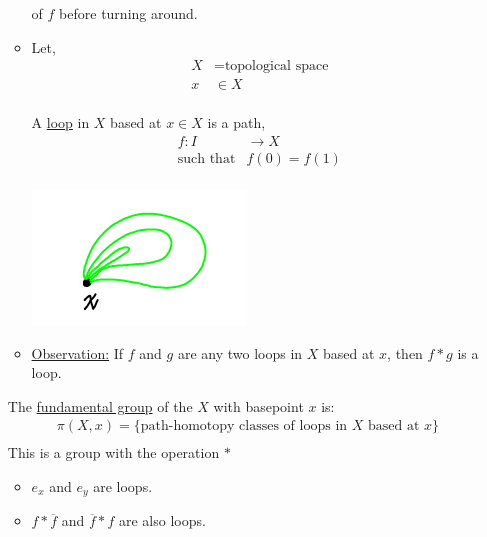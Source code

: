 \begin{itemize}
\begin{itemize}
            of $f$ before turning around.
        \item Let,
            \begin{align*}
                X&=\text{topological space}\\
                x&\in X\\
            \end{align*}
            \begin{definition} A \underline{loop} in $X$ based at $x\in X$ is a path,
            \begin{align*}
                f:I&\rightarrow X\\
                \text{such that}
                &f(0)=f(1)\\
            \end{align*}
            \end{definition}
            \begin{minipage}[c]{\linewidth}
                \begin{center}
                \includegraphics[]{images/loops.png}
                \end{center}
            \end{minipage}
        \item \underline{Observation:} If $f$ and $g$ are any two loops in $X$ based at $x$,
            then $f*g$ is a loop.
    \end{itemize}
            \begin{definition}
                The \underline{fundamental group} of the $X$ with basepoint $x$ is:
                \begin{align*}
                    \pi(X,x)=\{\text{path-homotopy classes of loops in $X$ based at $x$}\}\\
                \end{align*}
                This is a group with the operation $*$\\
            \end{definition}
    \begin{itemize}
        \item $e_x$ and $e_y$ are loops.
        \item $f*\overline{f}$ and $\overline{f}*f$ are also loops.

\end{itemize}
\end{itemize}
